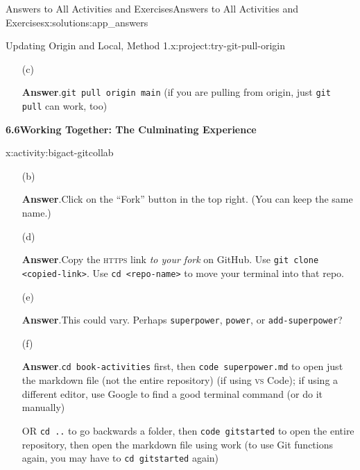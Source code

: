 \documentclass[oneside,10pt,]{book}
\newcommand{\blocktitlefont}{\relax}
\newcommand{\mono}[1]{\texttt{#1}}
\newcommand{\initialism}[1]{\textsc{\MakeLowercase{#1}}}
\begin{document}
\begin{solutions-chapter}{Answers to All Activities and Exercises}{}{Answers to All Activities and Exercises}{}{}{x:solutions:app_answers}
\begin{projectsolution}{6.1}{Updating Origin and Local, Method 1.}{x:project:try-git-pull-origin}%
\begin{enumerate}[font=\bfseries,label=(\alph*),ref=\alph*]
\item[(c)]\par\smallskip%
\noindent\textbf{\blocktitlefont Answer}.\hypertarget{g:answer:idp616791736-back}{}\quad{}\mono{git pull origin main} (if you are pulling from origin, just \mono{git pull} can work, too)%
\end{enumerate}
\end{projectsolution}%
\par\medskip
\noindent\textbf{\Large{}6.6\space\textperiodcentered\space{}Working Together: The Culminating Experience}
\begin{activitysolution}{6.3}{}{x:activity:bigact-gitcollab}%
\begin{enumerate}[font=\bfseries,label=(\alph*),ref=\alph*]
\item[(b)]\par\smallskip%
\noindent\textbf{\blocktitlefont Answer}.\hypertarget{g:answer:idp616841144-back}{}\quad{}Click on the ``Fork'' button in the top right. (You can keep the same name.)%
\item[(d)]\par\smallskip%
\noindent\textbf{\blocktitlefont Answer}.\hypertarget{g:answer:idp616838840-back}{}\quad{}Copy the \initialism{HTTPS} link \emph{to your fork} on GitHub. Use \mono{git clone <copied-link>}. Use \mono{cd <repo-name>} to move your terminal into that repo.%
\item[(e)]\par\smallskip%
\noindent\textbf{\blocktitlefont Answer}.\hypertarget{g:answer:idp616840888-back}{}\quad{}This could vary. Perhaps \mono{superpower}, \mono{power}, or \mono{add-superpower}?%
\item[(f)]\par\smallskip%
\noindent\textbf{\blocktitlefont Answer}.\hypertarget{g:answer:idp616849848-back}{}\quad{}\mono{cd book-activities} first, then \mono{code superpower.md} to open just the markdown file (not the entire repository) (if using \initialism{VS} Code); if using a different editor, use Google to find a good terminal command (or do it manually)%
\par
OR \mono{cd ..} to go backwards a folder, then \mono{code gitstarted} to open the entire repository, then open the markdown file using work (to use Git functions again, you may have to \mono{cd gitstarted} again)%

\end{enumerate}
\end{activitysolution}
\end{solutions-chapter}
\end{document}
